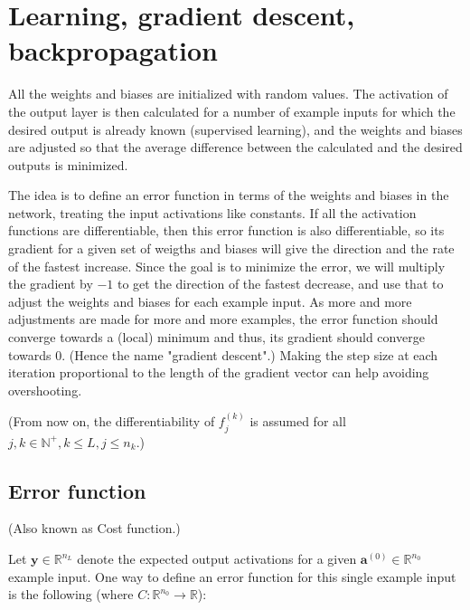 \documentclass[titlepage]{article}
\begin{document}
  \section{Learning, gradient descent, backpropagation}

    All the weights and biases are initialized with random values. The
    activation of the output layer is then calculated for a number of example
    inputs for which the desired output is already known (supervised learning),
    and the weights and biases are adjusted so that the average difference
    between the calculated and the desired outputs is minimized.

    The idea is to define an error function in terms of the weights and biases
    in the network, treating the input activations like constants. If all the
    activation functions are differentiable, then this error function is also
    differentiable, so its gradient for a given set of weigths and biases will
    give the direction and the rate of the fastest increase. Since the goal is
    to minimize the error, we will multiply the gradient by $-1$ to get the
    direction of the fastest decrease, and use that to adjust the weights and
    biases for each example input. As more and more adjustments are made for
    more and more examples, the error function should converge towards a
    (local) minimum and thus, its gradient should converge towards $0$. (Hence
    the name "gradient descent".) Making the step size at each iteration
    proportional to the length of the gradient vector can help avoiding
    overshooting.

    (From now on, the differentiability of $f_j^{(k)}$ is assumed for all
    $j, k \in \mathbb{N}^+, k \leq L, j \leq n_k$.)

    \subsection{Error function}

      (Also known as Cost function.)

      Let $\mathbf{y} \in \mathbb{R}^{n_L}$ denote the expected output
      activations for a given $\mathbf{a}^{(0)} \in \mathbb{R}^{n_0}$ example
      input. One way to define an error function for this single example input
      is the following (where $C : \mathbb{R}^{n_0} \rightarrow \mathbb{R}$):
\end{document}
